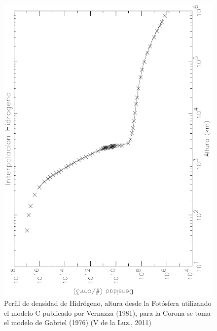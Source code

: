 \documentclass[9pt]{book}
\begin{document}
\begin{figure}[h]
\centering
\includegraphics[scale=.8]{densidad}
\caption{ Perfil de densidad de Hidr\'ogeno, altura desde la Fot\'osfera utilizando el modelo C publicado por Vernazza (1981), para la Corona se toma el modelo de Gabriel (1976) (V de la Luz., 2011) }
\label{d_cromosfera}
\end{figure}
\end{document}
